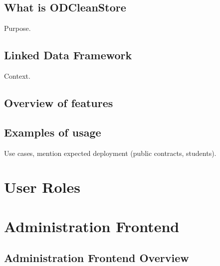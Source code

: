 
\newcommand{\version}{0.1}
\newcommand{\documentname}{User Manual}






\renewcommand{\contentsname}{Contents}
\tableofcontents
\bigskip

\newpage



\section{What is ODCleanStore}

Purpose.

\section{Linked Data Framework}

Context.

\section{Overview of features}

\section{Examples of usage}

Use cases, mention expected deployment (public contracts, students).


\chapter{User Roles}


\chapter{Administration Frontend}

\section{Administration Frontend Overview}

